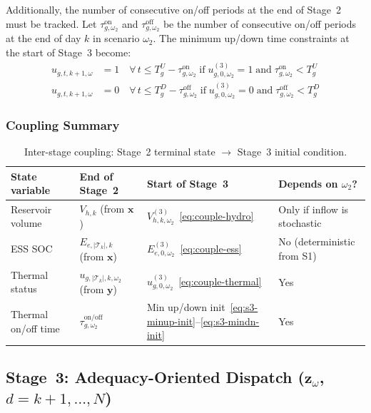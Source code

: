 \documentclass[11pt]{article}
\begin{document}
Additionally, the number of consecutive on/off periods at the end of
Stage~2 must be tracked. Let $\tau^{\mathrm{on}}_{g,\omega_2}$ and
$\tau^{\mathrm{off}}_{g,\omega_2}$ be the number of consecutive
on/off periods at the end of day $k$ in scenario $\omega_2$. The
minimum up/down time constraints at the start of Stage~3 become:
\begin{align}
  u_{g,t,k+1,\omega} &= 1
    \quad \forall\, t \leq T^U_g - \tau^{\mathrm{on}}_{g,\omega_2}
    \;\text{if}\; u^{(3)}_{g,0,\omega_2} = 1
    \;\text{and}\; \tau^{\mathrm{on}}_{g,\omega_2} < T^U_g
    \label{eq:s3-minup-init}\\
  u_{g,t,k+1,\omega} &= 0
    \quad \forall\, t \leq T^D_g - \tau^{\mathrm{off}}_{g,\omega_2}
    \;\text{if}\; u^{(3)}_{g,0,\omega_2} = 0
    \;\text{and}\; \tau^{\mathrm{off}}_{g,\omega_2} < T^D_g
    \label{eq:s3-mindn-init}
\end{align}

\subsubsection{Coupling Summary}

\begin{table}[H]
\centering
\caption{Inter-stage coupling: Stage~2 terminal state $\to$ Stage~3
  initial condition.}
\label{tab:coupling}
\small
\begin{tabular}{llll}
\toprule
\textbf{State variable} & \textbf{End of Stage~2}
  & \textbf{Start of Stage~3} & \textbf{Depends on $\omega_2$?} \\
\midrule
Reservoir volume &
  $V_{h,k}$ (from $\mathbf{x}$) &
  $V^{(3)}_{h,k,\omega_2}$~\eqref{eq:couple-hydro} &
  Only if inflow is stochastic \\
ESS SOC &
  $E_{e,|\mathcal{T}_k|,k}$ (from $\mathbf{x}$) &
  $E^{(3)}_{e,0,\omega_2}$~\eqref{eq:couple-ess} &
  No (deterministic from S1) \\
Thermal status &
  $u_{g,|\mathcal{T}_k|,k,\omega_2}$ (from $\mathbf{y}$) &
  $u^{(3)}_{g,0,\omega_2}$~\eqref{eq:couple-thermal} &
  Yes \\
Thermal on/off time &
  $\tau^{\mathrm{on/off}}_{g,\omega_2}$ &
  Min up/down init~\eqref{eq:s3-minup-init}--\eqref{eq:s3-mindn-init}
  & Yes \\
\bottomrule
\end{tabular}
\end{table}

\subsection{Stage~3: Adequacy-Oriented Dispatch
  ($\mathbf{z}_\omega$, $d = k{+}1,\ldots,N$)}
\label{sec:s3-obj}
\end{document}
